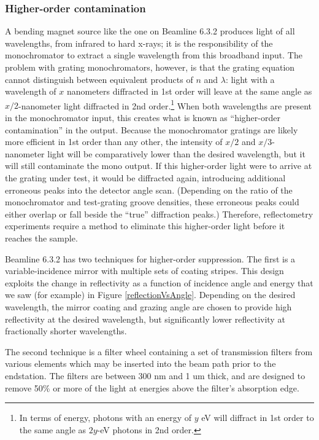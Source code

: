 \subsubsection{Higher-order contamination}
\label{higherOrderContamination}
A bending magnet source like the one on Beamline 6.3.2 produces light of all wavelengths, from infrared to hard x-rays; it is the responsibility of the monochromator to extract a single wavelength from this broadband input.  The problem with grating monochromators, however, is that the grating equation cannot distinguish between equivalent products of $n$ and $\lambda$: light with a wavelength of $x$ nanometers diffracted in 1st order will leave at the same angle as $x/2$-nanometer light diffracted in 2nd order.\footnote{In terms of energy, photons with an energy of $y$ eV will diffract in 1st order to the same angle as $2y$-eV photons in 2nd order.}  When both wavelengths are present in the monochromator input, this creates what is known as ``higher-order contamination'' in the output.  Because the monochromator gratings are likely more efficient in 1st order than any other, the intensity of $x/2$ and $x/3$-nanometer light will be comparatively lower than the desired wavelength, but it will still contaminate the mono output.  If this higher-order light were to arrive at the grating under test, it would be diffracted again, introducing additional erroneous peaks into the detector angle scan.  (Depending on the ratio of the monochromator and test-grating groove densities, these erroneous peaks could either overlap or fall beside the ``true'' diffraction peaks.)  Therefore, reflectometry experiments require a method to eliminate this higher-order light before it reaches the sample.

Beamline 6.3.2 has two techniques for higher-order suppression.  The first is a variable-incidence mirror with multiple sets of coating stripes.  This design exploits the change in reflectivity as a function of incidence angle and energy that we saw (for example) in Figure \ref{reflectionVsAngle}.  Depending on the desired wavelength, the mirror coating and grazing angle are chosen to provide high reflectivity at the desired wavelength, but significantly lower reflectivity at fractionally shorter wavelengths.

The second technique is a filter wheel containing a set of transmission filters from various elements which may be inserted into the beam path prior to the endstation.  The filters are between 300 nm and 1 um thick, and are designed to remove 50\% or more of the light at energies above the filter's absorption edge.

